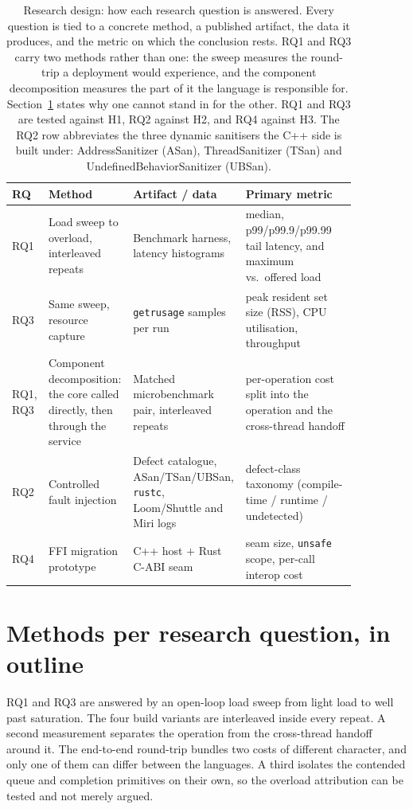 \documentclass[english,oneside,a4paper,censored,csm,software-track-2020]{HYthesisML}
\renewcommand{\arraystretch}{0.95}
\begin{document}
\begin{table}[H]
\centering
\caption[Research design: how each research question is answered]{Research design: how each research question is answered. Every question is tied to a
concrete method, a published artifact, the data it produces, and the metric on which the
conclusion rests. RQ1 and RQ3 carry two methods rather than one: the sweep measures the
round-trip a deployment would experience, and the component decomposition measures the part of
it the language is responsible for. Section~\ref{sec:methodbrief} states why one cannot stand in
for the other. RQ1 and RQ3 are tested against H1, RQ2 against H2, and RQ4 against H3. The RQ2 row
abbreviates the three dynamic sanitisers the C++ side is built under: AddressSanitizer (ASan),
ThreadSanitizer (TSan) and UndefinedBehaviorSanitizer
(UBSan).\label{tab:design}}
\renewcommand{\arraystretch}{1.25}
\begin{tabular}{@{}p{0.06\linewidth} p{0.24\linewidth} p{0.24\linewidth} p{0.32\linewidth}@{}}
\hline\hline
RQ & Method & Artifact / data & Primary metric \\
\hline
RQ1 & Load sweep to overload, interleaved repeats & Benchmark harness, latency histograms &
median, p99/p99.9/p99.99 tail latency, and maximum vs.\ offered load \\
RQ3 & Same sweep, resource capture & \texttt{getrusage} samples per run &
peak resident set size (RSS), CPU utilisation, throughput \\
RQ1, RQ3 & Component decomposition: the core called directly, then through the service &
Matched microbenchmark pair, interleaved repeats &
per-operation cost split into the operation and the cross-thread handoff \\
RQ2 & Controlled fault injection & Defect catalogue, ASan/TSan/UBSan, \texttt{rustc},
Loom/Shuttle and Miri logs &
defect-class taxonomy (compile-time / runtime / undetected) \\
RQ4 & FFI migration prototype & C++ host $+$ Rust C-ABI seam &
seam size, \texttt{unsafe} scope, per-call interop cost \\
\hline
\end{tabular}
\end{table}

\section{Methods per research question, in outline}\label{sec:methodbrief}
RQ1 and RQ3 are answered by an open-loop load sweep from light load to well past saturation.
The four build variants are interleaved inside every repeat. A second measurement separates the
operation from the cross-thread handoff around it. The end-to-end round-trip bundles two costs
of different character, and only one of them can differ between the languages. A third
isolates the contended queue and completion primitives on their own, so the overload
attribution can be tested and not merely argued.
\end{document}

